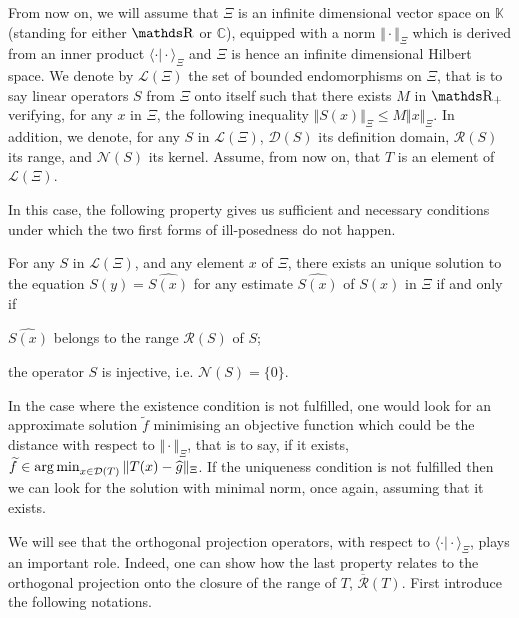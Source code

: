\bigskip

From now on, we will assume that $\Xi$ is an infinite dimensional vector space on $\mathds{K}$ (standing for either $\R$ or $\mathds{C}$), equipped with a norm $\Vert \cdot \Vert_{\Xi}$ which is derived from an inner product $\langle \cdot \vert \cdot \rangle_{\Xi}$ and $\Xi$ is hence an infinite dimensional Hilbert space.
We denote by $\mathcal{L}(\Xi)$ the set of bounded endomorphisms on $\Xi$, that is to say linear operators $S$ from $\Xi$ onto itself such that there exists $M$ in $\R_{+}$ verifying, for any $x$ in $\Xi$, the following inequality $\Vert S(x) \Vert_{\Xi} \leq M \Vert x \Vert_{\Xi}$.
In addition, we denote, for any $S$ in $\mathcal{L}(\Xi)$, $\mathcal{D}(S)$ its definition domain, $\mathcal{R}(S)$ its range, and $\mathcal{N}(S)$ its kernel.
Assume, from now on, that $T$ is an element of $\mathcal{L}(\Xi)$.

In this case, the following property gives us sufficient and necessary conditions under which the two first forms of ill-posedness do not happen.

\begin{pr*}
For any $S$ in $\mathcal{L}(\Xi)$, and any element $x$ of $\Xi$, there exists an unique solution to the equation $S(y) = \widehat{S(x)}$ for any estimate $\widehat{S(x)}$ of $S(x)$ in $\Xi$ if and only if
\item[\mylabel{BACKGROUND_INVERSEPROBLEMS_EXISTENCE}{\dgrau{\bfseries{(existence): }}}] $\widehat{S(x)}$ belongs to the range $\mathcal{R}(S)$ of $S$;
\item[\mylabel{BACKGROUND_INVERSEPROBLEMS_UNIQUENESS}{\dgrau\bfseries{(uniqueness): }}] the operator $S$ is injective, i.e. $\mathcal{N}(S) = \{0\}$.
\reEnd
\end{pr*}

In the case where the existence condition is not fulfilled, one would look for an approximate solution $\widetilde{f}$ minimising an objective function which could be the distance with respect to $\Vert \cdot \Vert_{\Xi}$, that is to say, if it exists, $\widetilde{f} \in \operatorname*{arg\,min}_{x \in \mathcal{D}(T)}\Vert T(x) - \widehat{g} \Vert_{\Xi}$.
If the uniqueness condition is not fulfilled then we can look for the solution with minimal norm, once again, assuming that it exists.

We will see that the orthogonal projection operators, with respect to $\langle \cdot \vert \cdot \rangle_{\Xi}$, plays an important role.
Indeed, one can show how the last property relates to the  orthogonal projection onto the closure of the range of $T$, $\overline{\mathcal{R}}(T)$.
First introduce the following notations.

